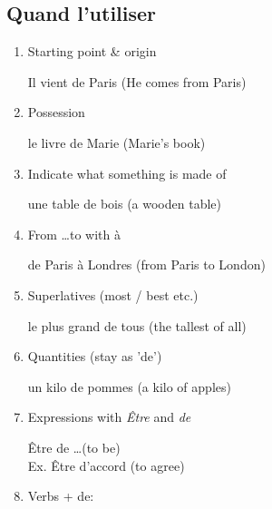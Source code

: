 \documentclass{book}
\begin{document}
        \subsection{Quand l'utiliser}
            \begin{enumerate}
                \item Starting point \& origin
                    \begin{center}
                        Il vient de Paris (He comes from Paris)
                    \end{center}
                \item Possession
                    \begin{center}
                        le livre de Marie (Marie's book)
                    \end{center}
                \item Indicate what something is made of
                    \begin{center}
                        une table de bois (a wooden table)
                    \end{center}
                \item From \dots to with à
                    \begin{center}
                        de Paris à Londres (from Paris to London)
                    \end{center}
                \item Superlatives (most / best etc.)
                    \begin{center}
                        le plus grand de tous (the tallest of all)
                    \end{center}
                \item Quantities (stay as 'de')
                    \begin{center}
                        un kilo de pommes (a kilo of apples)
                    \end{center}
                \item Expressions with \textit{Être} and \textit{de}
                    \begin{center}
                        Être de \dots (to be) \\
                        Ex. Être d'accord (to agree)
                    \end{center}
                \item Verbs + de:
                    \begin{enumerate}

\end{enumerate}
\end{enumerate}
\end{document}
